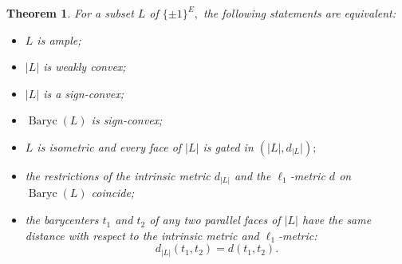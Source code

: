 \documentclass[11pt,a4paper]{amsart}
\newtheorem{theorem}{Theorem}
\theoremstyle{definition}
\numberwithin{equation}{section}
\DeclareMathOperator{\Baryc}{Baryc}
\newcommand{\covectors}{\ensuremath{L}}
\begin{document}
\begin{theorem} \label{metric-char} For a subset $\covectors$ of $\{ \pm 1\}^E,$ the following
statements are equivalent:

\begin{itemize}
\item[\rm(i)] ${\covectors}$ is ample;
\item[\rm(ii)] $|{\covectors}|$ is weakly convex;
\item[\rm(iii)]  $|\covectors|$ is a sign-convex;
\item[\rm(iv)]  $\Baryc(\covectors)$ is sign-convex;
\item[\rm(v)] $\covectors$ is isometric  and every face of $|{\covectors}|$ is gated in
$(|\covectors|,d_{|\covectors}|);$
\item[\rm(vi)] the restrictions of the intrinsic metric $d_{|{\covectors}|}$ and the $\ell_1$-metric  $d$ on $\Baryc(\covectors)$ coincide;
\item[\rm(vii)] the barycenters $t_1$ and $t_2$ of any two parallel faces of $|{\covectors}|$ have the same distance with respect to the intrinsic metric and $\ell_1$-metric:
$$d_{|\covectors|}(t_1,t_2)=d(t_1,t_2).$$
\end{itemize}
\end{theorem}
\end{document}
